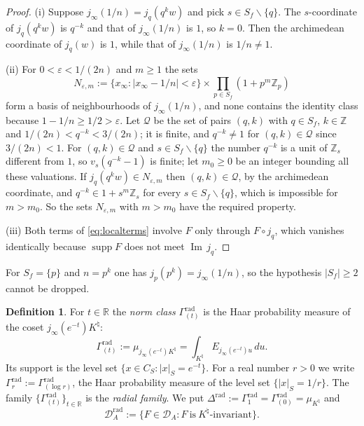 \documentclass[11pt]{amsart}
\theoremstyle{definition}
\newtheorem{definition}[theorem]{Definition}
\newcommand{\R}{\mathbb R}
\newcommand{\Z}{\mathbb Z}
\newcommand{\Iml}{\operatorname{Im}}
\newcommand{\supp}{\operatorname{supp}}
\newcommand{\Knat}{K^{\natural}}
\newcommand{\Drad}{\mathcal D_A^{\mathrm{rad}}}
\newcommand{\DA}{\mathcal D_A}
\begin{document}
\begin{proof}
(i) Suppose $j_\infty(1/n)=j_q(q^kw)$ and pick
$s\in S_f\smallsetminus\{q\}$. The $s$-coordinate of $j_q(q^kw)$ is $q^{-k}$
and that of $j_\infty(1/n)$ is $1$, so $k=0$. Then the archimedean coordinate
of $j_q(w)$ is $1$, while that of $j_\infty(1/n)$ is $1/n\ne1$.

(ii) For $0<\varepsilon<1/(2n)$ and $m\ge1$ the sets
\[
  N_{\varepsilon,m}:=\{x_\infty:|x_\infty-1/n|<\varepsilon\}\times
     \prod_{p\in S_f}(1+p^m\Z_p)
\]
form a basis of neighbourhoods of $j_\infty(1/n)$, and none contains the
identity class because $1-1/n\ge1/2>\varepsilon$. Let $\mathcal Q$ be the set
of pairs $(q,k)$ with $q\in S_f$, $k\in\Z$ and
$1/(2n)<q^{-k}<3/(2n)$; it is finite, and $q^{-k}\ne1$ for
$(q,k)\in\mathcal Q$ since $3/(2n)<1$. For $(q,k)\in\mathcal Q$ and
$s\in S_f\smallsetminus\{q\}$ the number $q^{-k}$ is a unit of $\Z_s$
different from $1$, so $v_s(q^{-k}-1)$ is finite; let $m_0\ge0$ be an integer
bounding all these valuations. If $j_q(q^kw)\in N_{\varepsilon,m}$ then
$(q,k)\in\mathcal Q$, by the archimedean coordinate, and
$q^{-k}\in1+s^m\Z_s$ for every $s\in S_f\smallsetminus\{q\}$, which is
impossible for $m>m_0$. So the sets $N_{\varepsilon,m}$ with $m>m_0$ have the
required property.

(iii) Both terms of \eqref{eq:localterms} involve $F$ only through
$F\circ j_q$, which vanishes identically because $\supp F$ does not meet
$\Iml\,j_q$.
\end{proof}

For $S_f=\{p\}$ and $n=p^k$ one has $j_p(p^k)=j_\infty(1/n)$, so the
hypothesis $|S_f|\ge2$ cannot be dropped.

\begin{definition}\label{def:normclass}
For $t\in\R$ the \emph{norm class} $\Gamma^{\mathrm{rad}}_{(t)}$ is the Haar
probability measure of the coset $j_\infty(e^{-t})\Knat$:
\begin{equation}\label{eq:normclass}
  \Gamma^{\mathrm{rad}}_{(t)}:=\mu_{j_\infty(e^{-t})\Knat}
   =\int_{\Knat}E_{j_\infty(e^{-t})u}\,du .
\end{equation}
Its support is the level set $\{x\in C_S:|x|_S=e^{-t}\}$. For a real number
$r>0$ we write $\Gamma_r^{\mathrm{rad}}:=\Gamma^{\mathrm{rad}}_{(\log r)}$,
the Haar probability measure of the level set $\{|x|_S=1/r\}$. The family
$\{\Gamma^{\mathrm{rad}}_{(t)}\}_{t\in\R}$ is the \emph{radial family}. We put
$\Delta^{\mathrm{rad}}:=\Gamma^{\mathrm{rad}}_1=\Gamma^{\mathrm{rad}}_{(0)}
=\mu_{\Knat}$ and
\[
  \Drad:=\{F\in\DA:F\ \text{is}\ \Knat\text{-invariant}\}.
\]
\end{definition}
\end{document}
